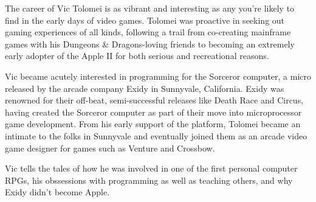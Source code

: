 The career of Vic Tolomei is as vibrant and interesting as any you’re likely to find in the early days of video games. Tolomei was proactive in seeking out gaming experiences of all kinds, following a trail from co-creating mainframe games with his Dungeons \& Dragons-loving friends to becoming an extremely early adopter of the Apple II for both serious and recreational reasons.

Vic became acutely interested in programming for the Sorceror computer, a micro released by the arcade company Exidy in Sunnyvale, California. Exidy was renowned for their off-beat, semi-successful releases like Death Race and Circus, having created the Sorceror computer as part of their move into microprocessor game development. From his early support of the platform, Tolomei became an intimate to the folks in Sunnyvale and eventually joined them as an arcade video game designer for games such as Venture and Crossbow.

Vic tells the tales of how he was involved in one of the first personal computer RPGs, his obssessions with programming as well as teaching others, and why Exidy didn’t become Apple.

\noindent\makebox[\linewidth]{\rule{\paperwidth}{0.4pt}}
